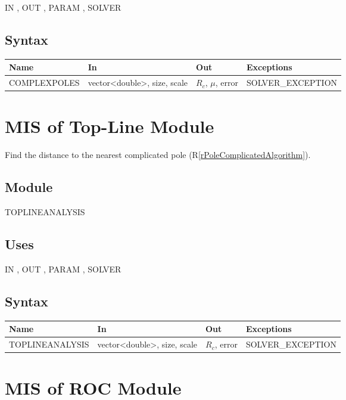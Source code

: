 \documentclass[12pt, titlepage]{article}
\newcommand{\rref}[1]{(R\ref{#1})}
\begin{document}
IN , OUT , PARAM , SOLVER 

\subsection{Syntax}

\begin{tabular}{p{3.5cm} p{5cm} p{3cm} >{\raggedright\arraybackslash}p{5cm}}
\toprule
\textbf{Name} & \textbf{In} & \textbf{Out} & \textbf{Exceptions} \\
\midrule
  COMPLEXPOLES & vector<double>, size, scale &  $R_c$, $\mu$, error & SOLVER\_EXCEPTION \\
\bottomrule
\end{tabular}

\section{MIS of Top-Line Module} \label{sc:MIS_POLETOPLINEMODULE}

Find the distance to the nearest complicated pole \rref{rPoleComplicatedAlgorithm}.

\subsection{Module}

TOPLINEANALYSIS

\subsection{Uses}

IN , OUT , PARAM , SOLVER 

\subsection{Syntax}

\begin{tabular}{p{4cm} p{5cm} p{3cm} >{\raggedright\arraybackslash}p{5cm}}
\toprule
\textbf{Name} & \textbf{In} & \textbf{Out} & \textbf{Exceptions} \\
\midrule
  TOPLINEANALYSIS & vector<double>, size, scale &  $R_c$, error & SOLVER\_EXCEPTION \\
\bottomrule
\end{tabular}

\section{MIS of ROC Module} \label{sc:MIS_ROC}
\end{document}
